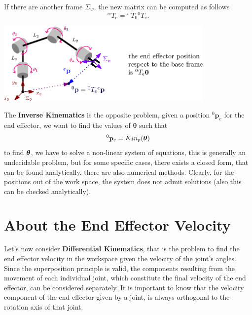 \documentclass[10pt, letterpaper]{report}
\begin{document}
If there are another frame $\Sigma_w$, the new matrix can be computed as follows\begin{equation}
    {}^w T_e={}^w T_0{}^0 T_e.
\end{equation}\begin{center}
    \includegraphics[width=0.8\textwidth ]{images/T_matrix_new.eps} 
\end{center}

The \textbf{Inverse Kinematics} is the opposite problem, given a position ${}^0\mathbf p_e$ for the end effector, we want to find the values of $\boldsymbol\theta$ such that\begin{equation}
    {}^0\mathbf p_e=Kin_p({\boldsymbol{\theta}})
\end{equation}
to find ${\boldsymbol{\theta}}$, we have to solve a non-linear system of equations, this is generally an undecidable problem, but for some specific cases, there exists a closed form, that can be found analytically, there are also numerical methods. Clearly, for the positions out of the work space, the system does not admit solutions (also this can be checked analytically).
\section{About the End Effector Velocity}
Let's now consider \textbf{Differential Kinematics}, that is the problem to find the end effector velocity in the workspace given the velocity of the joint's angles. 
Since the superposition principle is valid, the components resulting from the movement of each individual joint, which constitute the final velocity of the end effector, can be considered separately. It is important to know that the velocity component of the end effector given by a joint, is always orthogonal to the rotation axis of that joint.\bigskip
\end{document}
